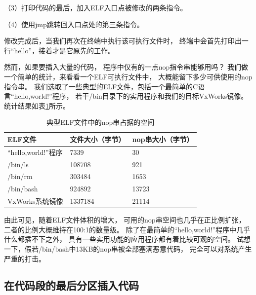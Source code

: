 （3）打印代码的最后，加入ELF入口点被修改的两条指令。

（4）使用jmp跳转回入口点处的第三条指令。

修改完成后，当我们再次在终端中执行该可执行文件时，
终端中会首先打印出一行“hello”，接着才是它原先的工作。




然而，如果要插入大量的代码，
程序中仅有的一点nop指令串能够用吗？
我们做一个简单的统计，来看看一个ELF可执行文件中，
大概能留下多少可供使用的nop指令串。
我们选取了一些典型的ELF文件，包括一个最简单的C语言“hello,world!”程序，
若干/bin目录下的实用程序和我们的目标VxWorks镜像。
统计结果如表\ref{nopbytes}所示。

\begin{table}
  \centering
  \caption{典型ELF文件中的nop串占据的空间}
  \label{nopbytes}
  \begin{tabular}{l|l|l}
     \hline
     ELF文件       & 文件大小（字节）& nop串大小（字节） \\ \hline
 “hello,world!”程序  & 7339           & 30                 \\ \hline
     /bin/ls      & 108708          & 921                \\ \hline
     /bin/rm      & 303484         & 1653                \\ \hline  
     /bin/bash    & 924892        & 13723              \\ \hline
     VxWorks系统镜像 & 1337184        & 21114              \\ \hline
  \end{tabular}
\end{table}  

由此可见，随着ELF文件体积的增大，
可用的nop串空间也几乎在正比例扩张，
二者的比例大概维持在100:1的数量级。
除了在最简单的“hello,world!”程序中几乎什么都插不下之外，
具有一些实用功能的应用程序都有着比较可观的空间。
试想一下，假若/bin/bash中13KB的nop串被全部塞满恶意代码，
完全可以对系统产生严重的打击。



\subsection{在代码段的最后分区插入代码}
\label{after}

